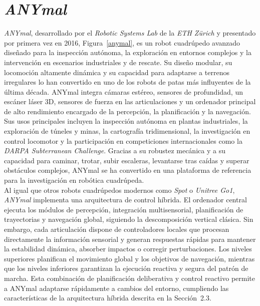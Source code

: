 \section{\textit{ANYmal}}
\textit{ANYmal}, desarrollado por el \textit{Robotic Systems Lab} de la \textit{ETH Zürich} y 
presentado por primera vez en 2016, Figura~\ref{anymal}, es un robot cuadrúpedo avanzado diseñado 
para la inspección autónoma, la exploración en entornos complejos y la intervención en escenarios 
industriales y de rescate. Su diseño modular, su locomoción altamente dinámica y su capacidad para
adaptarse a terrenos irregulares lo han convertido en uno de los robots de patas más influyentes de
la última década. ANYmal integra cámaras estéreo, sensores de profundidad, un escáner láser 3D, 
sensores de fuerza en las articulaciones y un ordenador principal de alto rendimiento encargado de
la percepción, la planificación y la navegación. \\

Sus usos principales incluyen la inspección autónoma en plantas industriales, la exploración de
túneles y minas, la cartografía tridimensional, la investigación en control locomotor y la 
participación en competiciones internacionales como la \textit{DARPA Subterranean Challenge}. 
Gracias a su robustez mecánica y a su capacidad para caminar, trotar, subir escaleras, levantarse
tras caídas y superar obstáculos complejos, ANYmal se ha convertido en una plataforma de referencia 
para la investigación en robótica cuadrúpeda. \\

Al igual que otros robots cuadrúpedos modernos como \textit{Spot} o \textit{Unitree Go1}, 
\textit{ANYmal} implementa una arquitectura de control híbrida. El ordenador central ejecuta los 
módulos de percepción, integración multisensorial, planificación de trayectorias y navegación global,
siguiendo la descomposición vertical clásica. Sin embargo, cada articulación dispone de controladores
locales que procesan directamente la información sensorial y generan respuestas rápidas para mantener
la estabilidad dinámica, absorber impactos o corregir perturbaciones. Los niveles superiores
planifican el movimiento global y los objetivos de navegación, mientras que los niveles inferiores
garantizan la ejecución reactiva y segura del patrón de marcha. Esta combinación de planificación
deliberativa y control reactivo permite a ANYmal adaptarse rápidamente a cambios del entorno,
cumpliendo las características de la arquitectura híbrida descrita en la Sección~2.3. \\

